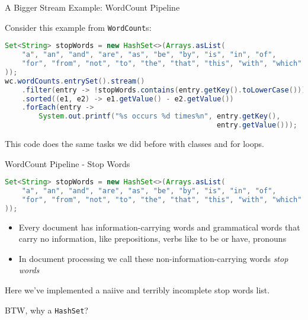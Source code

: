 \documentclass{beamer}
\begin{document}
\begin{frame}[fragile]{A Bigger Stream Example: WordCount Pipeline}

Consider this example from {\tt WordCount}s:
\begin{lstlisting}[language=Java]
Set<String> stopWords = new HashSet<>(Arrays.asList(
    "a", "an", "and", "are", "as", "be", "by", "is", "in", "of",
    "for", "from", "not", "to", "the", "that", "this", "with", "which"
));
wc.wordCounts.entrySet().stream()
    .filter(entry -> !stopWords.contains(entry.getKey().toLowerCase()))
    .sorted((e1, e2) -> e1.getValue() - e2.getValue())
    .forEach(entry ->
        System.out.printf("%s occurs %d times%n", entry.getKey(),
                                                  entry.getValue()));
\end{lstlisting}

This code does the same tasks we did before with classes and for loops.

\end{frame}

\begin{frame}[fragile]{WordCount Pipeline - Stop Words}

\begin{lstlisting}[language=Java]
Set<String> stopWords = new HashSet<>(Arrays.asList(
    "a", "an", "and", "are", "as", "be", "by", "is", "in", "of",
    "for", "from", "not", "to", "the", "that", "this", "with", "which"
));

\end{lstlisting}


\begin{itemize}
\item Every document has information-carrying words and grammatical words that carry no information, like prepositions, verbs like to be or have, pronouns
\item In document processing we call these non-information-carrying words {\it stop words}
\end{itemize}

Here we've implemented a naiive and terribly incomplete stop words list.\\

\vspace{.1in}

BTW, why a {\tt HashSet}?

\end{frame}
\end{document}
